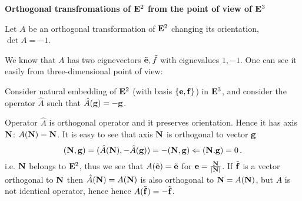 











\baselineskip=14pt
\def\vare {\varepsilon}
\def\A {{\bf A}}
\def\t {\tilde}
\def\bs {{\bf s}}
\def\a {\alpha}
\def\d {\delta}
\def\K {{\bf K}}
\def\N {{\bf N}}
\def\w {\omega}
\def\s {{\sigma}}
\def\S {{\Sigma}}
\def\s {{\sigma}}
\def\p{\partial}
\def\vare{{\varepsilon}}
\def\Q {{\bf Q}}
\def\D {{\cal D}}
\def\G {{\Gamma}}
\def\C {{\bf C}}
\def\L {{\cal L}}
\def\F {{\cal F}}
\def\Z {{\bf Z}}
\def\U  {{\cal U}}
\def\H {{\bf H}}
\def\R  {{\bf R}}
\def\S  {{\bf S}}
\def\E  {{\bf E}}
\def\l {\lambda}
\def\degree {{\bf {\rm degree}\,\,}}
\def \finish {${\,\,\vrule height1mm depth2mm width 8pt}$}
\def \m {\medskip}
\def\p {\partial}
\def\r {{\bf r}}
\def\pt {{\bf pt}}
\def\v {{\bf v}}
\def\n {{\bf n}}
\def\t {{\bf t}}
\def\b {{\bf b}}
\def\c {{\bf c }}
\def\e{{\bf e}}
\def\ac {{\bf a}}
\def \X   {{\bf X}}
\def \Y   {{\bf Y}}
\def \x   {{\bf x}}
\def \y   {{\bf y}}
\def\ss  {\sigma_{\rm sph}}
\def \grad {{\rm grad\,}}
\def\e {{\bf e}}
\def\f {{\bf f}}
\def\g {{\bf g}}

\centerline {\bf Orthogonal transfromations of $\E^2$ from the 
            point of view of $\E^3$}

Let $A$ be an orthogonal transformation of $\E^2$
changing its orientation, $\det A=-1$.

We know that $A$ has two eignevectors $\tilde\e,\tilde f$
with eignevalues $1,-1$. One can see it easily from three-dimensional point of view:

Consider natural embedding of $\E^2$ (with basis $\{\e,\f\}$)
in $\E^3$,
and consider the operator $\hat A$ such that $\hat A(\g)=-\g$.

 Operator  $\hat A$ is orthogonal operator and it preserves orientation.
Hence it has axis $\N$: $A(\N)=\N$. It is easy to see
that axis $\N$ is orthogonal to vector $\g$ 
        $$
(\N,\g)=(\hat A(\N),-\hat A(\g))=-(\N,\g)\Leftarrow (\N.\g)=0\,.
        $$
i.e. $\N$ belongs to $\E^2$, thus we see that $A(\tilde\e)=\tilde\e$
for $\e={\N\over |\N|}$.  If $\tilde \f$ is a vector orthogonal to
$\N$ then $\hat A(\N)=A(\N)$ is also orthogonal to $\N=A(\N)$,
but $A$ is not identical operator, hence
hence $A(\tilde \f)=-\tilde \f$.

\bye
